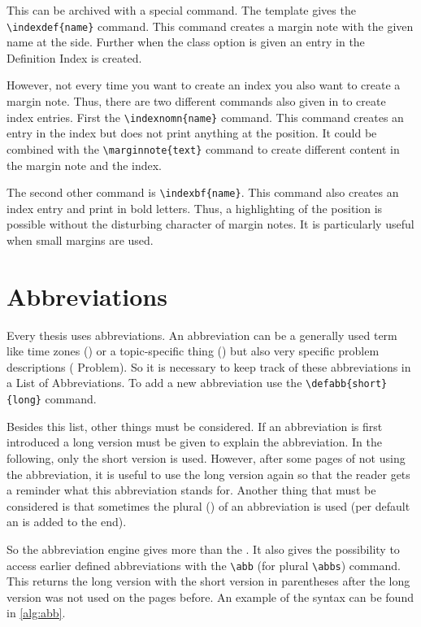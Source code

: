 This can be archived with a special command. The template gives the
\verb!\indexdef{name}! command. This command creates a margin note with the
given name at the side. Further when the
 class option is given an
entry in the Definition Index is created.

However, not every time you want to create an index you also want to create a
margin note. Thus, there are two different commands also given in to create
index entries. First the \verb!\indexnomn{name}! command. This command creates
an entry in the index but does not print anything at the position. It could be
combined with the \verb!\marginnote{text}! command to create different content
in the margin note and the index.

The second other command is \verb!\indexbf{name}!. This command also creates
an index entry and print  in bold letters.  Thus, a highlighting of the
position is possible without the disturbing character of margin notes. It is
particularly useful when small margins are used.

\section{Abbreviations}%
\label{sec:abb}

Every thesis uses abbreviations. An abbreviation can be a generally used term
like time zones () or a topic-specific thing () but also
very specific problem descriptions ( Problem). So it is necessary to
keep track of these abbreviations in a List of Abbreviations.  To add a new
abbreviation use the \verb|\defabb{short}{long}| command.

Besides this list, other things must be considered. If an abbreviation is
first introduced a long version must be given to explain the abbreviation. In
the following, only the short version is used. However, after some pages of
not using the abbreviation, it is useful to use the long version again so that
the reader gets a reminder what this abbreviation stands for.  Another thing
that must be considered is that sometimes the plural () of an
abbreviation is used (per default an  is added to the end).

So the abbreviation engine gives more than the .
It also gives the possibility to access earlier defined abbreviations with the
\verb!\abb! (for plural \verb!\abbs!) command. This returns the long version
with the short version in parentheses after the long version was not used on
the pages before. An example of the syntax can be found in \autoref{alg:abb}.

